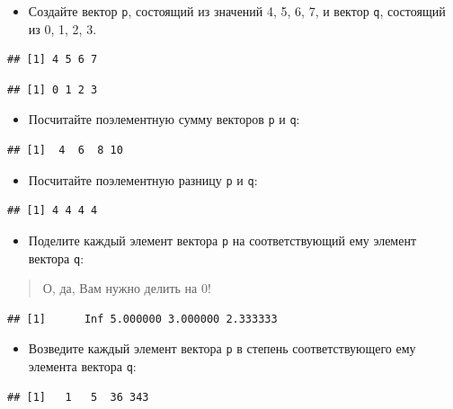 \documentclass[]{book}
\providecommand{\tightlist}{%
  \setlength{\itemsep}{0pt}\setlength{\parskip}{0pt}}
\begin{document}
\begin{itemize}
\tightlist
\item
  Создайте вектор \texttt{p}, состоящий из значений 4, 5, 6, 7, и вектор
  \texttt{q}, состоящий из 0, 1, 2, 3.
\end{itemize}

\begin{verbatim}
## [1] 4 5 6 7
\end{verbatim}

\begin{verbatim}
## [1] 0 1 2 3
\end{verbatim}

\begin{itemize}
\tightlist
\item
  Посчитайте поэлементную сумму векторов \texttt{p} и \texttt{q}:
\end{itemize}

\begin{verbatim}
## [1]  4  6  8 10
\end{verbatim}

\begin{itemize}
\tightlist
\item
  Посчитайте поэлементную разницу \texttt{p} и \texttt{q}:
\end{itemize}

\begin{verbatim}
## [1] 4 4 4 4
\end{verbatim}

\begin{itemize}
\tightlist
\item
  Поделите каждый элемент вектора \texttt{p} на соответствующий ему
  элемент вектора \texttt{q}:
\end{itemize}

\begin{quote}
О, да, Вам нужно делить на 0!
\end{quote}

\begin{verbatim}
## [1]      Inf 5.000000 3.000000 2.333333
\end{verbatim}

\begin{itemize}
\tightlist
\item
  Возведите каждый элемент вектора \texttt{p} в степень соответствующего
  ему элемента вектора \texttt{q}:
\end{itemize}

\begin{verbatim}
## [1]   1   5  36 343
\end{verbatim}
\end{document}
